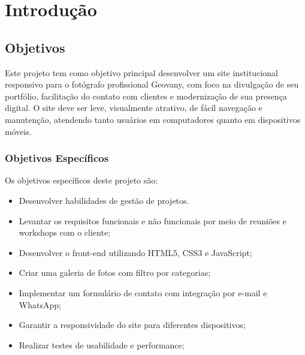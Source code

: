 \chapter{Introdução}
\label{chap:intro}






% 
\section{Objetivos}
\label{sec:obj}
Este projeto tem como objetivo principal desenvolver um site institucional responsivo para o fotógrafo profissional Geovany, com foco na divulgação de seu portfólio, facilitação do contato com clientes e modernização de sua presença digital. O site deve ser leve, visualmente atrativo, de fácil navegação e manutenção, atendendo tanto usuários em computadores quanto em dispositivos móveis.
\label{sec:obj}

\subsection{Objetivos Específicos}
\label{ssec:objesp}
Os objetivos específicos deste projeto são:
\begin{itemize}
      \item Desenvolver habilidades de gestão de projetos.
      \item Levantar os requisitos funcionais e não funcionais por meio de reuniões e workshops com o cliente;
      \item Desenvolver o front-end utilizando HTML5, CSS3 e JavaScript;
      \item Criar uma galeria de fotos com filtro por categorias;
      \item Implementar um formulário de contato com integração por e-mail e WhatsApp;
      \item Garantir a responsividade do site para diferentes dispositivos;
      \item Realizar testes de usabilidade e performance;
  \end{itemize}

